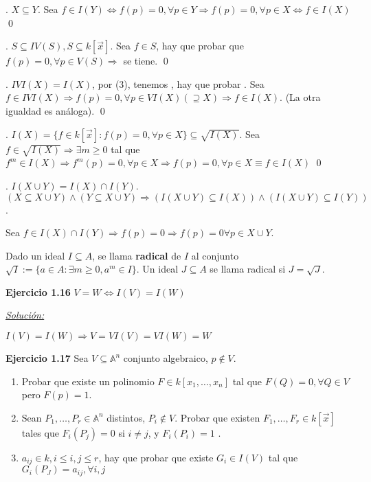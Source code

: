\begin{Dem}
. $X\subseteq Y$. Sea $f\in I(Y) \Leftrightarrow f(p)=0, \forall p \in Y \Rightarrow f(p)=0, \forall p\in X \Leftrightarrow f\in I(X)$ \qed

. $S\subseteq IV(S), S\subseteq k[\vec{x}]$. Sea $f\in S$, hay que probar que $f(p)=0, \forall p\in V(S) \Rightarrow $ se tiene. \qed

. $IVI(X)=I(X)$, por (3), tenemos \framebox{$\supseteq $}, hay que probar \framebox{$\subseteq $}. Sea $f\in IVI(X) \Rightarrow f(p)=0, \forall p \in VI(X) (\supseteq X )  \Rightarrow f\in I(X)$. (La otra igualdad es análoga). \qed

. $I(X)= \{ f\in k[\vec{x}] : f(p) = 0, \forall p\in X \} \subseteq \sqrt{I(X)}$. Sea $f\in  \sqrt{I(X)} \Rightarrow \exists m \ge 0 $ tal que $f^m\in I(X) \Rightarrow f^m(p)=0, \forall p\in X \Rightarrow f(p)=0, \forall p\in X \equiv f\in I(X) $ \qed
 
. $I(X\cup Y) = I(X)\cap I(Y)$. $(X\subseteq X\cup Y)\wedge (Y\subseteq X\cup Y) \Rightarrow (I(X\cup Y)\subseteq I(X))\wedge (I(X\cup Y)\subseteq I(Y))$.

Sea $f\in I(X)\cap I(Y) \Rightarrow f(p)=0 \Rightarrow f(p) = 0 \forall p \in X\cup Y$.

\end{Dem}

\begin{Def}
Dado un ideal $I\subseteq A$, se llama \textbf{radical} de $I$ al conjunto $\sqrt{I} := \{a \in A : \exists m \ge 0, a^m \in I \}$. Un ideal $J \subseteq A$ se llama radical si $J= \sqrt{J}$.
\end{Def}

\textbf{Ejercicio 1.16 } $V=W \Leftrightarrow  I(V)=I(W)$

\underline{\textit{Solución: }}

\framebox{$\Leftarrow $} $I(V)=I(W) \Rightarrow V=VI(V)=VI(W)=W$

\textbf{Ejercicio 1.17 } Sea $V\subseteq \mathbb{A}^n$ conjunto algebraico, $p\notin V$. 
\begin{enumerate}

\item Probar que existe un polinomio $F\in k[x_1,\dots, x_n]$ tal que $F(Q)=0, \forall Q\in V$ pero $F(p)=1$.
\item Sean $P_1,\dots , P_r \in \mathbb{A}^n$ distintos, $P_i\notin V$. Probar que existen $F_1,\dots ,F_r \in k[\vec{x}]$ tales que $F_i(P_j) = 0$ si $i\neq j$, y $F_i(P_i)=1$ . 
\item $a_{ij}\in k, i\le i,j \le r$, hay que probar que existe $G_i \in I(V) $ tal que $G_i(P_J)=a_{ij}, \forall i,j$
\end{enumerate}

